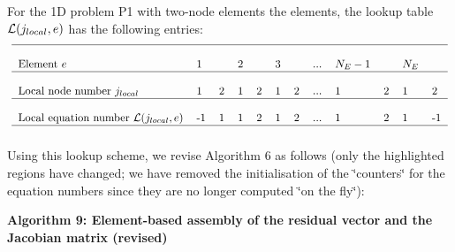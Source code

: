 For the 1D problem P1 with two-\/node elements the elements, the lookup table $ {\cal L}(j_{local},e)$ has the following entries\+: \[ \mbox{ \begin{tabular}{l l l l l l l l l l l l } \hline \\ \mbox{Element $e$} & 1 & & 2 & & 3 & & ... & $N_E-1$ & & $N_E$ & \\ \hline \\ \mbox{Local node number $j_{local}$} & 1 & 2 & 1 & 2 & 1 & 2 & ... & 1 & 2 & 1 & 2 \\ \hline \\ \mbox{Local equation number ${\cal L}(j_{local},e)$} & -1 & 1 & 1 & 2 & 1 & 2 & ... & 1 & 2 & 1 & -1\\ \hline \\ \end{tabular} } \] Using this lookup scheme, we revise Algorithm 6 as follows (only the highlighted regions have changed; we have removed the initialisation of the \char`\"{}counters\char`\"{} for the equation numbers since they are no longer computed \char`\"{}on the fly\char`\"{})\+:

\begin{center} {\bfseries  Algorithm 9\+: Element-\/based assembly of the residual vector and the Jacobian matrix (revised) } \end{center} 


